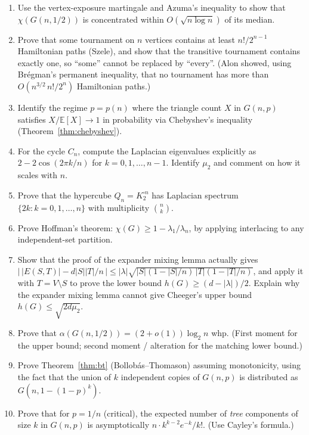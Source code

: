 \documentclass{article}
\theoremstyle{definition}
\begin{document}
\begin{enumerate}[resume]
\item Use the vertex-exposure martingale and Azuma's inequality to show
that $\chi(G(n, 1/2))$ is concentrated within $O(\sqrt{n \log n})$ of
its median.

\item Prove that some tournament on $n$ vertices contains at least
$n!/2^{n - 1}$ Hamiltonian paths (Szele), and show that the transitive
tournament contains exactly one, so ``some'' cannot be replaced by
``every''. (Alon showed, using Br\'egman's permanent inequality, that
no tournament has more than $O(n^{3/2}\, n!/2^{n})$ Hamiltonian paths.)

\item Identify the regime $p = p(n)$ where the triangle count $X$ in
$G(n,p)$ satisfies $X/\mathbb{E}[X] \to 1$ in probability via
Chebyshev's inequality (Theorem~\ref{thm:chebyshev}).

\item For the cycle $C_n$, compute the Laplacian eigenvalues explicitly as
$2 - 2\cos(2\pi k/n)$ for $k = 0, 1, \dots, n - 1$. Identify $\mu_2$
and comment on how it scales with $n$.

\item Prove that the hypercube $Q_n = K_2^{\square n}$ has Laplacian
spectrum $\{2k : k = 0, 1, \dots, n\}$ with multiplicity $\binom{n}{k}$.

\item Prove Hoffman's theorem: $\chi(G) \ge 1 - \lambda_1/\lambda_n$, by
applying interlacing to any independent-set partition.

\item Show that the proof of the expander mixing lemma actually gives
$\big|\, |E(S, T)| - d|S||T|/n \,\big| \le |\lambda|\sqrt{|S|(1 - |S|/n)\,|T|(1 - |T|/n)}$,
and apply it with $T = V \setminus S$ to prove the lower bound
$h(G) \ge (d - |\lambda|)/2$. Explain why the expander mixing lemma
cannot give Cheeger's upper bound $h(G) \le \sqrt{2 d \mu_2}$.

\item Prove that $\alpha(G(n, 1/2)) = (2 + o(1)) \log_2 n$ whp. (First
moment for the upper bound; second moment / alteration for the
matching lower bound.)

\item Prove Theorem~\ref{thm:bt} (Bollob\'as--Thomason) assuming monotonicity,
using the fact that the union of $k$ independent copies of $G(n, p)$ is
distributed as $G(n, 1 - (1 - p)^k)$.

\item Prove that for $p = 1/n$ (critical), the expected number of
\emph{tree} components of size $k$ in $G(n, p)$ is asymptotically
$n \cdot k^{k - 2} e^{-k}/k!$. (Use Cayley's formula.)


\end{enumerate}
\end{document}
